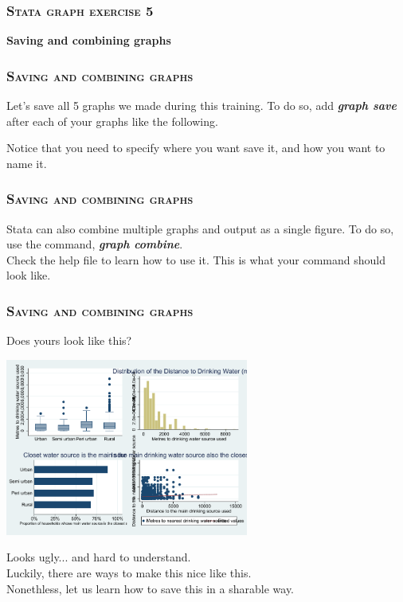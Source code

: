 \documentclass[10pt]{beamer}
\begin{document}
	\begin{frame}
	\frametitle{\textsc{Stata graph exercise 5}}
		\begin{center}
		\Large \textbf{Saving and combining graphs}
		\end{center}
	\end{frame}	
	
	\begin{frame}
	\frametitle{\textsc{Saving and combining graphs}}
		 Let's save all 5 graphs we made during this training.
		\vspace{2mm}
		\onslide<2-> To do so, add \textbf{\textit{graph save}} 
					 after each of your graphs like the following.
	
		\vspace{1mm}
		Notice that you need to specify where you want save it, 
		and how you want to name it.
	\end{frame}
	
	\begin{frame}
	\frametitle{\textsc{Saving and combining graphs}}
		 Stata can also combine multiple graphs and output
					 as a single figure.
			\vspace{1mm}
		\onslide<2-> To do so, use the command,  \textbf{\textit{graph combine}}. \\
					 Check the help file to learn how to use it.
			\vspace{1mm}					
		\onslide<3-> This is what your command should look like.
	
	\end{frame}
				
	\begin{frame}
	\frametitle{\textsc{Saving and combining graphs}}
		 Does yours look like this?
	
\begin{center}
    \includegraphics[width=0.6\textwidth]{combined.pdf}
\end{center}
		 Looks ugly... and hard to understand. \\ \vspace{1mm}
					 Luckily, there are ways to make this nice like this. \\
		\onslide<3-> Nonethless, let us learn how to save this in a sharable way.
	\end{frame}
	
\end{document}
